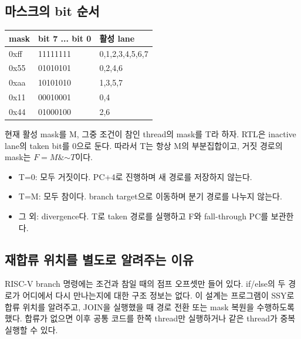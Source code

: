 \documentclass[a4paper,11pt]{article}
\begin{document}
\subsection{마스크의 bit 순서}
\par\medskip
\begin{tabularx}{\linewidth}{p{25mm}p{40mm}Y}
\toprule mask & bit 7 ... bit 0 & 활성 lane \\\midrule
0xff & 11111111 & 0,1,2,3,4,5,6,7\\
0x55 & 01010101 & 0,2,4,6\\
0xaa & 10101010 & 1,3,5,7\\
0x11 & 00010001 & 0,4\\
0x44 & 01000100 & 2,6\\
\bottomrule
\end{tabularx}
\par\medskip
현재 활성 mask를 M, 그중 조건이 참인 thread의 mask를 T라 하자. RTL은 inactive lane의 taken bit를 0으로 둔다. 따라서 T는 항상 M의 부분집합이고, 거짓 경로의 mask는 $F=M\mathbin{\&}\mathord{\sim}T$이다.
\begin{itemize}
\item T=0: 모두 거짓이다. PC+4로 진행하며 새 경로를 저장하지 않는다.
\item T=M: 모두 참이다. branch target으로 이동하며 분기 경로를 나누지 않는다.
\item 그 외: divergence다. T로 taken 경로를 실행하고 F와 fall-through PC를 보관한다.
\end{itemize}
\subsection{재합류 위치를 별도로 알려주는 이유}
RISC-V branch 명령에는 조건과 참일 때의 점프 오프셋만 들어 있다. if/else의 두 경로가 어디에서 다시 만나는지에 대한 구조 정보는 없다. 이 설계는 프로그램이 SSY로 합류 위치를 알려주고, JOIN을 실행했을 때 경로 전환 또는 mask 복원을 수행하도록 했다. 합류가 없으면 이후 공통 코드를 한쪽 thread만 실행하거나 같은 thread가 중복 실행할 수 있다.
\end{document}
